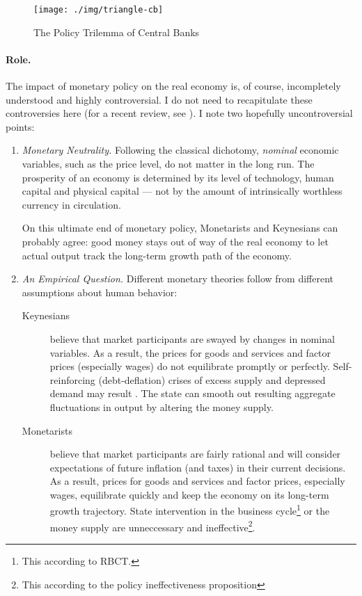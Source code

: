  \begin{figure}[htbp]
	\centering
	\texttt{[image: ./img/triangle-cb]}
	\caption{The Policy Trilemma of Central Banks}
	\label{fig:triangle-cb}
\end{figure}

\paragraph[Role]{Role.} %
The impact of monetary policy on the real economy is, of course, incompletely understood and highly controversial. I do not need to recapitulate these controversies here (for a recent review, see \citealt{Wapshott2011}). I note two hopefully uncontroversial points:

\begin{enumerate}
	\item \emph{Monetary Neutrality.} \label{it:monetaryneutrality} Following the classical dichotomy, \emph{nominal} economic variables, such as the price level, do not matter in the long run. The prosperity of an economy is determined by its level of technology, human capital and physical capital --- not by the amount of intrinsically worthless currency in circulation.

	On this ultimate end of monetary policy, Monetarists and Keynesians can probably agree: good money stays out of way of the real economy to let actual output track the long-term growth path of the economy.

	\item \emph{An Empirical Question.} Different monetary theories follow from different assumptions about human behavior:

	\begin{description}
		\item[Keynesians] believe that market participants are swayed by changes in nominal variables. As a result, the prices for goods and services and factor prices (especially wages) do not equilibrate promptly or perfectly. Self-reinforcing (debt-deflation) crises of excess supply and depressed demand may result \citep{Fisher1933}. The state can smooth out resulting aggregate fluctuations in output by altering the money supply.
		\item[Monetarists] believe that market participants are fairly rational and will consider expectations of future inflation (and taxes) in their current decisions. As a result, prices for goods and services and factor prices, especially wages, equilibrate quickly and keep the economy on its long-term growth trajectory. State intervention in the business cycle\footnote{
			This according to \gls{RBCT}.}
		or the money supply are unneccessary and ineffective\footnote{
			This according to the policy ineffectiveness proposition}.
	\end{description}


\end{enumerate}
